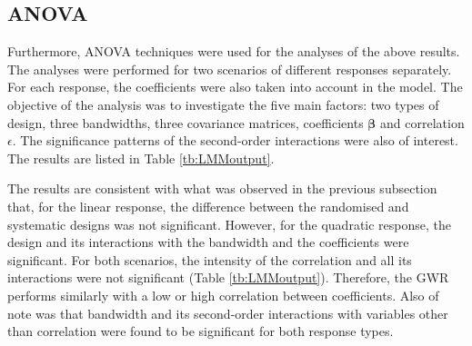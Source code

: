 \documentclass[a4paper]{article} 	%
\begin{document}


\subsection{ANOVA}\label{Sec:anova}

Furthermore, ANOVA techniques were used for the analyses of the above results. The analyses were performed for two scenarios of different responses separately. For each response, the coefficients were also taken into account in the model. The objective of the analysis was to investigate the five main factors: two types of design, three bandwidths, three covariance matrices, coefficients $\bm{\beta}$ and correlation $\epsilon$. The significance patterns of the second-order interactions were also of interest. The results are listed in Table \ref{tb:LMMoutput}. 

The results are consistent with what was observed in the previous subsection that, for the linear response, the difference between the randomised and systematic designs was not significant. However, for the quadratic response, the design and its interactions with the bandwidth and the coefficients were significant. For both scenarios, the intensity of the correlation and all its interactions were not significant (Table \ref{tb:LMMoutput}). Therefore, the GWR performs similarly with a low or high correlation between coefficients. Also of note was that bandwidth and its second-order interactions with variables other than correlation were found to be significant for both response types. 
\end{document}
